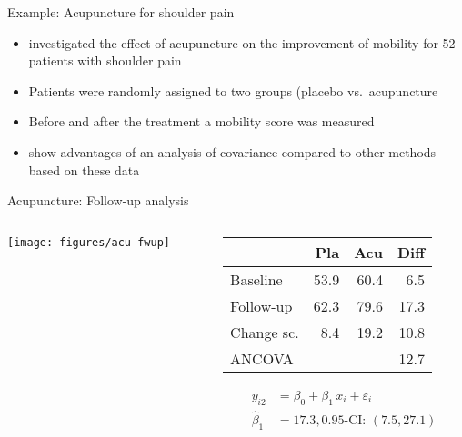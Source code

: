 \documentclass{beamer}
\begin{document}
\begin{frame}{Example: Acupuncture for shoulder pain}
\begin{itemize}
  \item \citet{Kleinhenz1999} investigated the effect of acupuncture on
    the improvement of mobility for 52 patients with shoulder pain
  \item Patients were randomly assigned to two groups (placebo vs.\
    acupuncture
  \item Before and after the treatment a mobility score was measured
  \item \citet{VickersAltman2001} show advantages of an analysis of
    covariance compared to other methods based on these data
\end{itemize}
\end{frame}


\begin{frame}{Acupuncture: Follow-up analysis}
\begin{columns}[T]
\begin{column}{5.5cm}
  \texttt{[image: figures/acu-fwup]}
\end{column}
%
\begin{column}{5.5cm}
  \vspace*{1em}\small
  \begin{tabular}{lrrr}
  \hline
             &  Pla &  Acu & Diff \\ \hline
  Baseline   & 53.9 & 60.4 &  6.5 \\
  Follow-up  & 62.3 & 79.6 & 17.3 \\
  Change sc. &  8.4 & 19.2 & 10.8 \\
  ANCOVA     &      &      & 12.7 \\ \hline
  \end{tabular}
\begin{align*}
         y_{i2} &= \beta_0 + \beta_1 \, x_i + \varepsilon_i \\
  \hat{\beta}_1 &= 17.3, 0.95\text{-CI: } (7.5, 27.1)
\end{align*}
\end{column}
\end{columns}
\end{frame}
\end{document}
